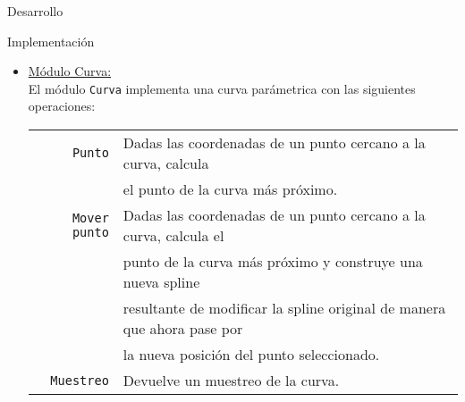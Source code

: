 \begin{section}{Desarrollo}
\begin{subsection}{Implementación}
\begin{itemize}
			\item \underline{Módulo Curva:}\\
				El módulo \texttt{Curva} implementa una curva parámetrica con las siguientes operaciones:\\
				
				\begin{tabular}{rl}
					\texttt{Punto} & Dadas las coordenadas de un punto cercano a la curva, calcula\\
								   & el punto de la curva más próximo.\\
					\texttt{Mover punto} & Dadas las coordenadas de un punto cercano a la curva, calcula el\\
										 & punto de la curva más próximo y construye una nueva spline\\
										 & resultante de modificar la spline original de manera que ahora pase por\\
										 & la nueva posición del punto seleccionado.\\
					\texttt{Muestreo} & Devuelve un muestreo de la curva.\\
				\end{tabular}\\
		\end{itemize}
	\end{subsection}
\end{section}
